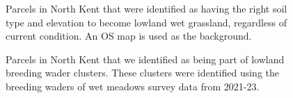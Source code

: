 \documentclass[
  12pt,
  letterpaper,
  DIV=11,
  numbers=noendperiod]{scrartcl}
\begin{document}
\begin{figure}[H]


\caption{\label{fig-KentSuitHab}Parcels in North Kent that were
identified as having the right soil type and elevation to become lowland
wet grassland, regardless of current condition. An OS map is used as the
background.}

\end{figure}%

\begin{figure}[H]


\caption{\label{fig-KentLawton}Parcels in North Kent that we identified
as being part of lowland breeding wader clusters. These clusters were
identified using the breeding waders of wet meadows survey data from
2021-23.}

\end{figure}%
\end{document}
